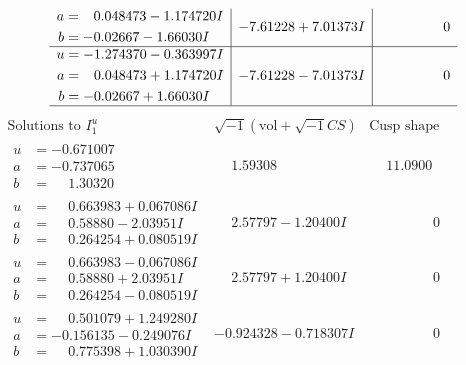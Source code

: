 \documentclass[1p]{elsarticle_modified}
\theoremstyle{definition}
\newcommand{\I}{\sqrt{-1}}
\begin{document}
$$\begin{array}{c|c|c}
\begin{aligned}
a &= \phantom{-}0.048473 - 1.174720 I \\
b &= -0.02667 - 1.66030 I\end{aligned}
 & -7.61228 + 7.01373 I & \phantom{-0.000000 } 0 \\ \hline\begin{aligned}
u &= -1.274370 - 0.363997 I \\
a &= \phantom{-}0.048473 + 1.174720 I \\
b &= -0.02667 + 1.66030 I\end{aligned}
 & -7.61228 - 7.01373 I & \phantom{-0.000000 } 0\\
 \hline 
 \end{array}$$\newpage$$\begin{array}{c|c|c}  
\text{Solutions to }I^u_{1}& \I (\text{vol} + \sqrt{-1}CS) & \text{Cusp shape}\\
 \hline 
\begin{aligned}
u &= -0.671007\phantom{ +0.000000I} \\
a &= -0.737065\phantom{ +0.000000I} \\
b &= \phantom{-}1.30320\phantom{ +0.000000I}\end{aligned}
 & \phantom{-}1.59308\phantom{ +0.000000I} & \phantom{-}11.0900\phantom{ +0.000000I} \\ \hline\begin{aligned}
u &= \phantom{-}0.663983 + 0.067086 I \\
a &= \phantom{-}0.58880 - 2.03951 I \\
b &= \phantom{-}0.264254 + 0.080519 I\end{aligned}
 & \phantom{-}2.57797 - 1.20400 I & \phantom{-0.000000 } 0 \\ \hline\begin{aligned}
u &= \phantom{-}0.663983 - 0.067086 I \\
a &= \phantom{-}0.58880 + 2.03951 I \\
b &= \phantom{-}0.264254 - 0.080519 I\end{aligned}
 & \phantom{-}2.57797 + 1.20400 I & \phantom{-0.000000 } 0 \\ \hline\begin{aligned}
u &= \phantom{-}0.501079 + 1.249280 I \\
a &= -0.156135 - 0.249076 I \\
b &= \phantom{-}0.775398 + 1.030390 I\end{aligned}
 & -0.924328 - 0.718307 I & \phantom{-0.000000 } 0 \\ \hline\begin{aligned}

\end{aligned}
\end{array}$$
\end{document}
